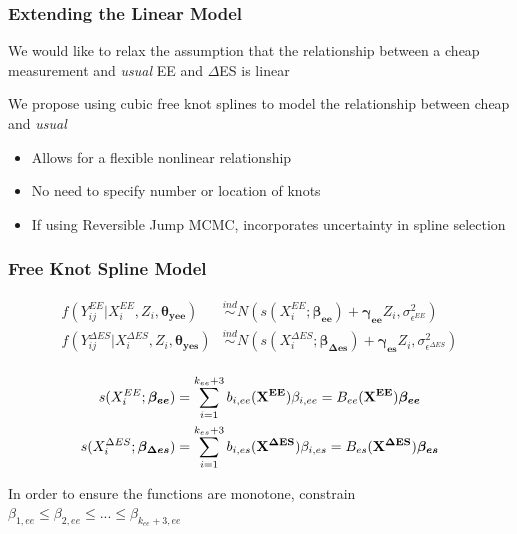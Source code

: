 \documentclass[handout]{beamer}\usepackage[]{graphicx}\usepackage[]{color}
\begin{document}
\begin{frame}
\frametitle{Extending the Linear Model}
We would like to relax the assumption that the relationship between a cheap measurement and \emph{usual} EE and $\Delta$ES is linear \\

\vspace{0.5cm}

We propose using cubic free knot splines to model the relationship between cheap and \emph{usual}

\begin{itemize}
\item
Allows for a flexible nonlinear relationship
\item
No need to specify number or location of knots
\item
If using Reversible Jump MCMC, incorporates uncertainty in spline selection

\end{itemize}


\end{frame}


\begin{frame}
\frametitle{Free Knot Spline Model}

\begin{align*}
  f(Y_{ij}^{EE}|X_i^{EE},Z_i,\boldsymbol{\theta_{yee}}) &\overset{ind}{\sim} N(s(X_i^{EE};\boldsymbol{\beta_{ee}}) + \boldsymbol{\gamma_{ee}}Z_i,\sigma_{\epsilon^{EE}}^2) \\
    f(Y_{ij}^{\Delta ES}|X_i^{\Delta ES},Z_i,\boldsymbol{\theta_{yes}}) &\overset{ind}{\sim} N(s(X_i^{\Delta ES};\boldsymbol{\beta_{\Delta es}}) + \boldsymbol{\gamma_{es}}Z_i,\sigma_{\epsilon^{\Delta ES}}^2) \\
\end{align*}

\begin{align*}
  s(X_i^{EE};\boldsymbol{\beta_{ee}}) &= \sum_{i=1}^{k_{ee}+3} b_{i,ee}({\bf X^{EE}}) \beta_{i,ee} = B_{ee}({\bf X^{EE}}) \boldsymbol{\beta_{ee}}\\
  s(X_i^{\Delta ES};\boldsymbol{\beta_{\Delta es}}) &= \sum_{i=1}^{k_{es}+3} b_{i,es}({\bf X^{\Delta ES}}) \beta_{i,es} = B_{es}({\bf X^{\Delta ES}}) \boldsymbol{\beta_{es}}
\end{align*}

In order to ensure the functions are monotone, constrain $\beta_{1,ee} \leq \beta_{2,ee} \leq ... \leq \beta_{k_{ee}+3,ee}$ 

% 
% 

\end{frame}
\end{document}
